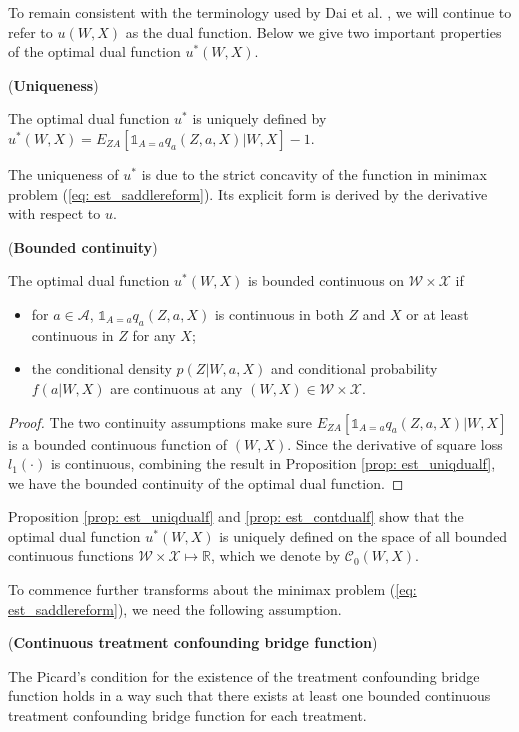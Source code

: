 To remain consistent with the terminology used by Dai et al. \cite{dai2017learning}, 
we will continue to refer to $u(W,X)$ as the dual function. 
Below we give two important properties of the optimal dual function $u^*(W,X)$. 

\begin{proposition}(\textbf{Uniqueness})
    
    \label{prop: est_uniqdualf}
    The optimal dual function $u^*$ is uniquely defined by $u^*(W,X)=E_{ZA}[\mathds{1}_{A=a}q_a(Z,a,X)|W,X]-1$.  
\end{proposition}
The uniqueness of $u^*$ is due to the strict concavity of the function in minimax problem (\ref{eq: est_saddlereform}). 
Its explicit form is derived by the derivative with respect to $u$. 

\begin{proposition}(\textbf{Bounded continuity})
    
    \label{prop: est_contdualf}
    The optimal dual function $u^*(W,X)$ is bounded continuous on $\mathcal{W}\times\mathcal{X}$ if 
    \begin{itemize}
        \item for $a\in\mathcal{A}$, $\mathds{1}_{A=a}q_a(Z,a,X)$ is continuous in both $Z$ and $X$ or at least continuous in $Z$ for any $X$; 
        \item the conditional density $p(Z|W,a,X)$ and conditional probability $f(a|W,X)$ are continuous at any $(W,X)\in\mathcal{W}\times\mathcal{X}$. 
    \end{itemize} 
\end{proposition}
\begin{proof}
    The two continuity assumptions make sure $E_{ZA}[\mathds{1}_{A=a}q_a(Z,a,X)|W,X]$ is a bounded continuous function of $(W,X)$. 
    Since the derivative of square loss $l_1(\cdot)$ is continuous, 
    combining the result in Proposition \ref{prop: est_uniqdualf}, 
    we have the bounded continuity of the optimal dual function. 
\end{proof}

Proposition \ref{prop: est_uniqdualf} and \ref{prop: est_contdualf} show that 
the optimal dual function $u^*(W,X)$ is uniquely defined on the space of all bounded continuous functions $\mathcal{W}\times\mathcal{X}\mapsto\mathbb{R}$, 
which we denote by $\mathcal{C}_0(W,X)$. 

To commence further transforms about the minimax problem (\ref{eq: est_saddlereform}), we need the following assumption. 
\begin{assumption}(\textbf{Continuous treatment confounding bridge function})
    
    \label{ass: est_contqbridge}
    The Picard's condition for the existence of the treatment confounding bridge function  
    holds in a way such that there exists at least one bounded continuous treatment confounding bridge function for each treatment. 
\end{assumption}

